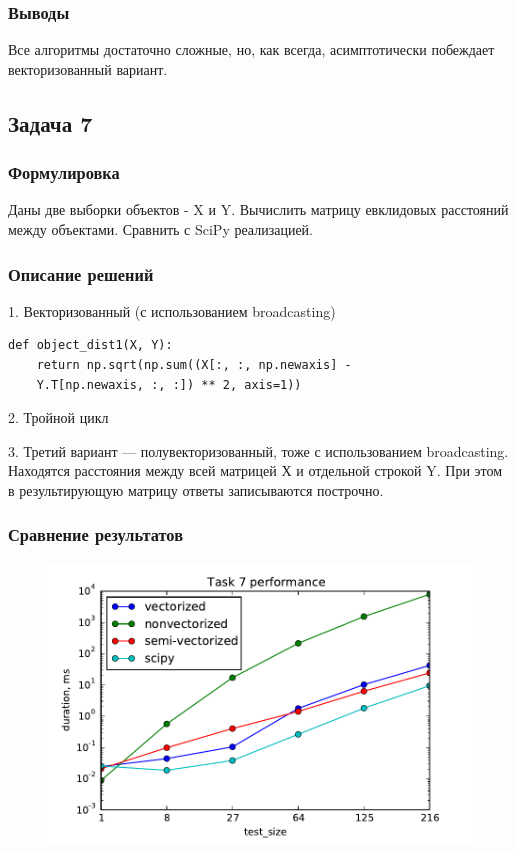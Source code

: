 \documentclass[12pt]{article}
\begin{document}
\subsubsection*{Выводы}

Все алгоритмы достаточно сложные, но, как всегда, асимптотически побеждает векторизованный вариант.

\subsection{Задача 7}

\subsubsection*{Формулировка}

Даны две выборки объектов - X и Y. Вычислить матрицу евклидовых расстояний между объектами. Сравнить с SciPy реализацией.

\subsubsection*{Описание решений}

1. Векторизованный (с использованием broadcasting)
\begin{lstlisting}
def object_dist1(X, Y):
    return np.sqrt(np.sum((X[:, :, np.newaxis] - 
    Y.T[np.newaxis, :, :]) ** 2, axis=1))
\end{lstlisting}

2. Тройной цикл

3. Третий вариант --- полувекторизованный, тоже с использованием broadcasting. Находятся расстояния между всей матрицей Х и отдельной строкой Y. При этом в результирующую матрицу ответы записываются построчно.

\newpage

\subsubsection*{Сравнение результатов}

\begin{figure}[h]
	\begin{center}
		\includegraphics[scale=0.7]{task7}
	\end{center}
\end{figure}
\end{document}
